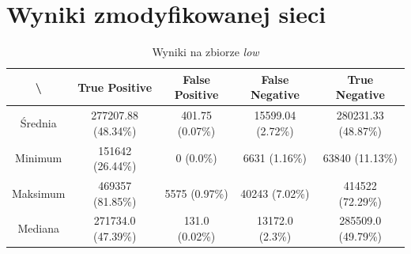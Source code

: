 \newpage
\section{Wyniki zmodyfikowanej sieci}
\label{sec:wyniki_zmodyfikowanej}

\begin{table}[!h]
	\centering
	\caption{Wyniki na zbiorze \textit{low}}
	\vspace{6pt}
	{\footnotesize
		\begin{tabular}{|c|c|c|c|c|}
			\hline \textbackslash & True Positive & False Positive & False Negative & True Negative \\
      \hline Średnia & 277207.88 (48.34\%) & 401.75 (0.07\%) & 15599.04 (2.72\%) & 280231.33 (48.87\%) \\
      \hline Minimum & 151642 (26.44\%) & 0 (0.0\%) & 6631 (1.16\%) & 63840 (11.13\%) \\
      \hline Maksimum & 469357 (81.85\%) & 5575 (0.97\%) & 40243 (7.02\%) & 414522 (72.29\%) \\
      \hline Mediana & 271734.0 (47.39\%) & 131.0 (0.02\%) & 13172.0 (2.3\%) & 285509.0 (49.79\%) \\
      \hline
		\end{tabular}
	}
	\vspace{0pt}
\end{table}

\vspace{1cm}

